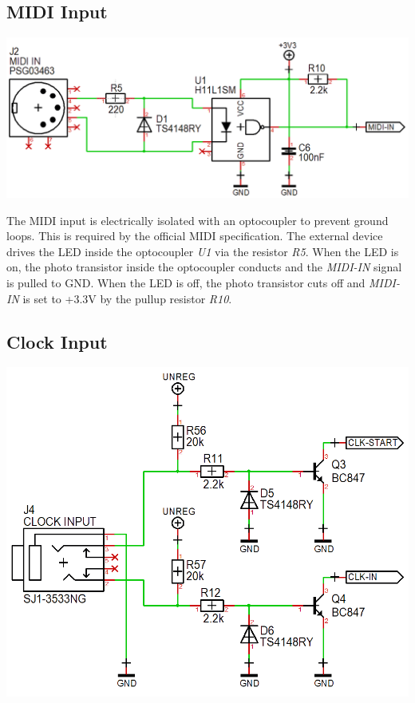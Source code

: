 \documentclass{scrartcl}
\begin{document}
\subsection{MIDI Input}

\begin{center}
    \includegraphics[scale=0.40]{assets/schema-midi.png}
\end{center}

The MIDI input is electrically isolated with an optocoupler to prevent ground loops. This is required by the official MIDI specification. The external device drives the LED inside the optocoupler \emph{U1} via the resistor \emph{R5}. When the LED is on, the photo transistor inside the optocoupler conducts and the \emph{MIDI-IN} signal is pulled to GND. When the LED is off, the photo transistor cuts off and \emph{MIDI-IN} is set to +3.3V by the pullup resistor \emph{R10}.

\subsection{Clock Input}

\begin{center}
    \includegraphics[scale=0.40]{assets/schema-clocks.png}
\end{center}
\end{document}
